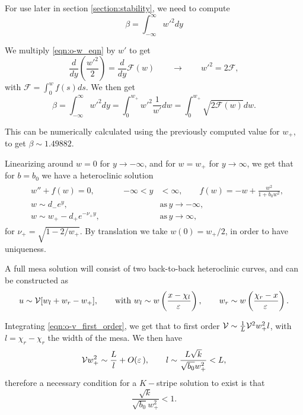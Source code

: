 For use later in section \eqref{section:stability}, we need to compute
% 
$$
\beta = \int_{-\infty}^{\infty}w'^2dy
$$
% 

We multiply \eqref{eqn:o-w_eqn} by $w'$ to get 
% 
\begin{equation*}
  \frac{d}{dy}\left(\frac{w'^2}{2} \right)=\frac{d}{dy}\mathcal{F}(w)\qquad\rightarrow\qquad w'^2 = 2\mathcal{F},
\end{equation*}
% 
with $\mathcal{F} = \int_0^wf(s)ds$. We then get
% 
\begin{equation}
\label{eqn:o-beta}
  \beta = \int_{-\infty}^{\infty}w'^2dy = \int_{0}^{w_+}w'^2\frac{1}{w'} dw = \int_{0}^{w_+}\sqrt{2\mathcal{F}(w)}dw.
\end{equation}
% 

This can be numerically calculated using the previously computed value for $w_+$, to get $\beta\sim1.49882$.

Linearizing around $w=0$ for $y\rightarrow -\infty$, and for $w=w_+$ for $y\rightarrow \infty$, we get that for $b=b_0$ we have a heteroclinic solution 
% 
\begin{equation*}
\begin{split}
\begin{aligned}
  &w''+f(w)=0,\qquad &-\infty<y&<\infty,\qquad f(w) = -w + \frac{w^2}{1+b_0w^2},\\
  &w\sim d_-e^y,\qquad &&\mathrm{as}\hspace{2pt}y\rightarrow -\infty,\\
  &w\sim w_+ - d_+e^{-\nu_+y},\qquad&&\mathrm{as}\hspace{2pt}y\rightarrow \infty,
\end{aligned}
\end{split}
\end{equation*}
% 
for $\nu_+ = \sqrt{1-2/w_+}$. By translation we take $w(0)=w_+/2$, in order to have uniqueness.

A full mesa solution will consist of two back-to-back heteroclinic curves, and can be constructed as
% 
\begin{equation*}
  u\sim \mathcal{V}[w_l + w_r - w_+],\qquad  \textrm{with }w_l\sim w\left(\frac{x-\chi_l}{\varepsilon\,}\right),\qquad w_r\sim w\left(\frac{\chi_r-x}{\varepsilon\,}\right).
\end{equation*}
% 

Integrating \eqref{eqn:o-v_first_order}, we get that to first order $\mathcal{V}\sim\frac{1}{L}\mathcal{V}^2w_+^2l$, with $l=\chi_r-\chi_r$ the width of the mesa. We then have
% 
\begin{equation*}
  \mathcal{V} w_+^2\sim\frac{L}{l} + O(\varepsilon\,),\qquad l\sim\frac{L\sqrt{k}}{\sqrt{b_0}w_+^2}<L,
\end{equation*}
% 
therefore a necessary condition for a $K-$stripe solution to exist is that 
% 
\begin{equation*}
  \frac{\sqrt{k}}{\sqrt{b_0}w_+^2}<1.
\end{equation*}
% 

